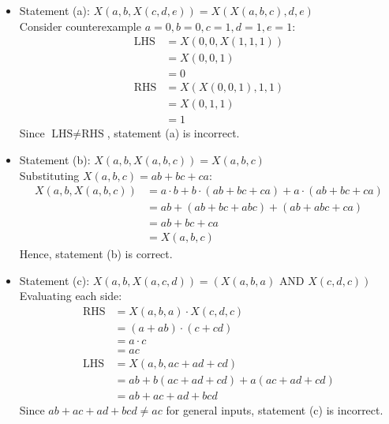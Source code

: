 \begin{enumerate}[label=\thesubsection.\arabic*, ref=\thesubsection.\theenumi]
\begin{itemize}
    \item Statement (a): $X(a,b,X(c,d,e)) = X(X(a,b,c),d,e)$ \\
    Consider counterexample $a=0, b=0, c=1, d=1, e=1$:
    \begin{align}
    \text{LHS} &= X(0, 0, X(1,1,1)) \\
               &= X(0, 0, 1) \\
               &= 0 \\
    \text{RHS} &= X(X(0,0,1), 1, 1) \\
               &= X(0, 1, 1) \\
               &= 1
    \end{align}
    Since $\text{LHS} \neq \text{RHS}$, statement (a) is incorrect.

    \item Statement (b): $X(a,b,X(a,b,c)) = X(a,b,c)$ \\
    Substituting $X(a,b,c) = ab + bc + ca$:
    \begin{align}
    X(a,b,X(a,b,c)) &= a \cdot b + b \cdot (ab + bc + ca) + a \cdot (ab + bc + ca) \\
                    &= ab + (ab + bc + abc) + (ab + abc + ca) \\
                    &= ab + bc + ca \\
                    &= X(a,b,c)
    \end{align}
    Hence, statement (b) is correct.

    \item Statement (c): $X(a,b,X(a,c,d)) = (X(a,b,a) \text{ AND } X(c,d,c))$ \\
    Evaluating each side:
    \begin{align}
    \text{RHS} &= X(a,b,a) \cdot X(c,d,c) \\
               &= (a + ab) \cdot (c + cd) \\
               &= a \cdot c \\
               &= ac \\
    \text{LHS} &= X(a, b, ac + ad + cd) \\
               &= ab + b(ac + ad + cd) + a(ac + ad + cd) \\
               &= ab + ac + ad + bcd
    \end{align}
    Since $ab + ac + ad + bcd \neq ac$ for general inputs, statement (c) is incorrect.


\end{itemize}
\end{enumerate}
